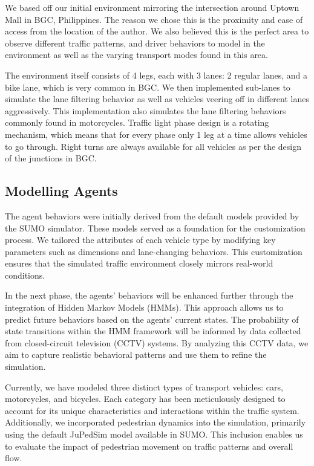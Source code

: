 
We based off our initial environment mirroring the intersection around Uptown Mall in BGC, Philippines. The reason we chose this is the proximity and ease of access from the location of the author. We also believed this is the perfect area to observe different traffic patterns, and driver behaviors to model in the environment as well as the varying transport modes found in this area.

The environment itself consists of 4 legs, each with 3 lanes: 2 regular lanes, and a bike lane, which is very common in BGC. We then implemented sub-lanes to simulate the lane filtering behavior as well as vehicles veering off in different lanes aggressively. This implementation also simulates the lane filtering behaviors commonly found in motorcycles. Traffic light phase design is a rotating mechanism, which means that for every phase only 1 leg at a time allows vehicles to go through. Right turns are always available for all vehicles as per the design of the junctions in BGC. 

\subsection{Modelling Agents}

The agent behaviors were initially derived from the default models provided by the SUMO simulator. These models served as a foundation for the customization process. We tailored the attributes of each vehicle type by modifying key parameters such as dimensions and lane-changing behaviors. This customization ensures that the simulated traffic environment closely mirrors real-world conditions.

In the next phase, the agents' behaviors will be enhanced further through the integration of Hidden Markov Models (HMMs). This approach allows us to predict future behaviors based on the agents’ current states. The probability of state transitions within the HMM framework will be informed by data collected from closed-circuit television (CCTV) systems. By analyzing this CCTV data, we aim to capture realistic behavioral patterns and use them to refine the simulation.

Currently, we have modeled three distinct types of transport vehicles: cars, motorcycles, and bicycles. Each category has been meticulously designed to account for its unique characteristics and interactions within the traffic system. Additionally, we incorporated pedestrian dynamics into the simulation, primarily using the default JuPedSim model available in SUMO. This inclusion enables us to evaluate the impact of pedestrian movement on traffic patterns and overall flow.

